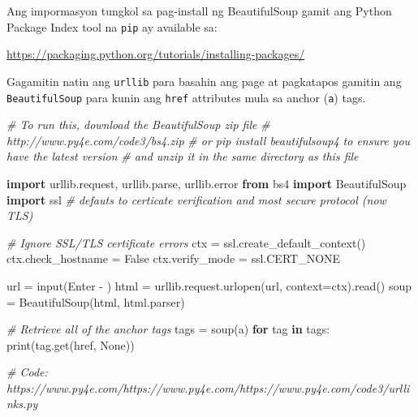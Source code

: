 \documentclass[10pt,]{book}
\newenvironment{Shaded}{}{}
\newcommand{\BuiltInTok}[1]{\textcolor[rgb]{0.00,0.50,0.00}{#1}}
\newcommand{\CommentTok}[1]{\textcolor[rgb]{0.38,0.63,0.69}{\textit{#1}}}
\newcommand{\ControlFlowTok}[1]{\textcolor[rgb]{0.00,0.44,0.13}{\textbf{#1}}}
\newcommand{\ImportTok}[1]{\textcolor[rgb]{0.00,0.50,0.00}{\textbf{#1}}}
\newcommand{\KeywordTok}[1]{\textcolor[rgb]{0.00,0.44,0.13}{\textbf{#1}}}
\newcommand{\NormalTok}[1]{#1}
\newcommand{\OperatorTok}[1]{\textcolor[rgb]{0.40,0.40,0.40}{#1}}
\newcommand{\StringTok}[1]{\textcolor[rgb]{0.25,0.44,0.63}{#1}}
\newcommand{\VariableTok}[1]{\textcolor[rgb]{0.10,0.09,0.49}{#1}}
\begin{document}
Ang impormasyon tungkol sa pag-install ng BeautifulSoup gamit ang Python
Package Index tool na \texttt{pip} ay available sa:

\url{https://packaging.python.org/tutorials/installing-packages/}

Gagamitin natin ang \texttt{urllib} para basahin ang page at pagkatapos
gamitin ang \texttt{BeautifulSoup} para kunin ang \texttt{href}
attributes mula sa anchor (\texttt{a}) tags.

  

\begin{Shaded}
\begin{Highlighting}[]
\CommentTok{\# To run this, download the BeautifulSoup zip file}
\CommentTok{\# http://www.py4e.com/code3/bs4.zip}
\CommentTok{\# or pip install beautifulsoup4 to ensure you have the latest version}
\CommentTok{\# and unzip it in the same directory as this file}

\ImportTok{import}\NormalTok{ urllib.request, urllib.parse, urllib.error}
\ImportTok{from}\NormalTok{ bs4 }\ImportTok{import}\NormalTok{ BeautifulSoup}
\ImportTok{import}\NormalTok{ ssl }\CommentTok{\# defauts to certicate verification and most secure protocol (now TLS)}

\CommentTok{\# Ignore SSL/TLS certificate errors}
\NormalTok{ctx }\OperatorTok{=}\NormalTok{ ssl.create\_default\_context()}
\NormalTok{ctx.check\_hostname }\OperatorTok{=} \VariableTok{False}
\NormalTok{ctx.verify\_mode }\OperatorTok{=}\NormalTok{ ssl.CERT\_NONE}

\NormalTok{url }\OperatorTok{=} \BuiltInTok{input}\NormalTok{(}\StringTok{\textquotesingle{}Enter {-} \textquotesingle{}}\NormalTok{)}
\NormalTok{html }\OperatorTok{=}\NormalTok{ urllib.request.urlopen(url, context}\OperatorTok{=}\NormalTok{ctx).read()}
\NormalTok{soup }\OperatorTok{=}\NormalTok{ BeautifulSoup(html, }\StringTok{\textquotesingle{}html.parser\textquotesingle{}}\NormalTok{)}

\CommentTok{\# Retrieve all of the anchor tags}
\NormalTok{tags }\OperatorTok{=}\NormalTok{ soup(}\StringTok{\textquotesingle{}a\textquotesingle{}}\NormalTok{)}
\ControlFlowTok{for}\NormalTok{ tag }\KeywordTok{in}\NormalTok{ tags:}
    \BuiltInTok{print}\NormalTok{(tag.get(}\StringTok{\textquotesingle{}href\textquotesingle{}}\NormalTok{, }\VariableTok{None}\NormalTok{))}

\CommentTok{\# Code: https://www.py4e.com/https://www.py4e.com/https://www.py4e.com/code3/urllinks.py}
\end{Highlighting}
\end{Shaded}
\end{document}
